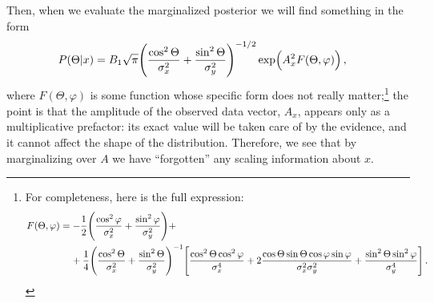 \documentclass[main.tex]{subfiles}
\begin{document}
Then, when we  evaluate the marginalized posterior we will find something in the form
%
\begin{align}
P(\Theta | x) &= B_1 \sqrt{\pi } \qty( \frac{\cos^2\Theta }{\sigma_x^2} + \frac{\sin^2 \Theta }{\sigma _y^2})^{-1/2}
\exp( A_x^2 F(\Theta , \varphi ))
\,,
\end{align}
%
where \(F (\Theta , \varphi )\) is some function whose specific form does not really matter;\footnote{For completeness, here is the full expression: 
%
\begin{align}
\begin{split}
F(\Theta , \varphi ) &=
- \frac{1}{2} \qty( \frac{\cos^2\varphi}{\sigma^2_x} + \frac{\sin^2\varphi}{\sigma^2_y})+  \\
&\phantom{=}\ 
+ \frac{1}{4} \qty( \frac{\cos^2 \Theta}{\sigma _x^2} + \frac{\sin^2 \Theta }{\sigma _y^2})^{-1}
\qty[ 
    \frac{\cos^2 \Theta \cos^2 \varphi }{\sigma _x^{4}}
    +2\frac{\cos \Theta \sin \Theta \cos \varphi \sin \varphi  }{\sigma _x^{2} \sigma _y^{2}}
    +\frac{\sin^2 \Theta \sin^2 \varphi }{\sigma _y^{4}}
]
\,.
\end{split}
\end{align}
%
} the point is that the amplitude of the observed data vector, \(A_x\), appears only as a multiplicative prefactor: its exact value will be taken care of by the evidence, and it cannot affect the shape of the distribution. 
Therefore, we see that by marginalizing over \(A\) we have ``forgotten'' any scaling information about \(x\). 
\end{document}
